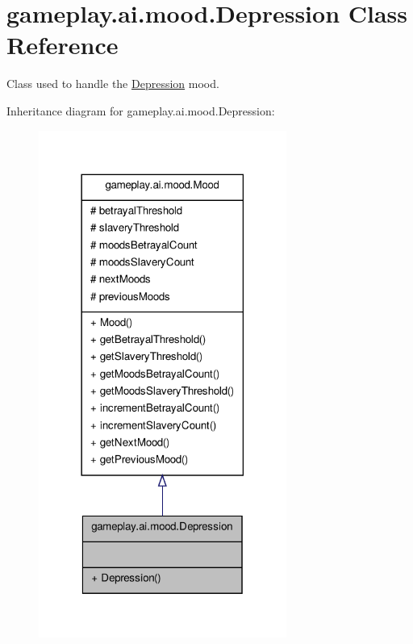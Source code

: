 \hypertarget{a00008}{\section{gameplay.\-ai.\-mood.\-Depression Class Reference}
\label{a00008}
}


Class used to handle the \hyperlink{a00008}{Depression} mood.  




Inheritance diagram for gameplay.\-ai.\-mood.\-Depression\-:
\nopagebreak
\begin{figure}[H]
\begin{center}
\leavevmode
\includegraphics[width=230pt]{a00107}
\end{center}
\end{figure}


